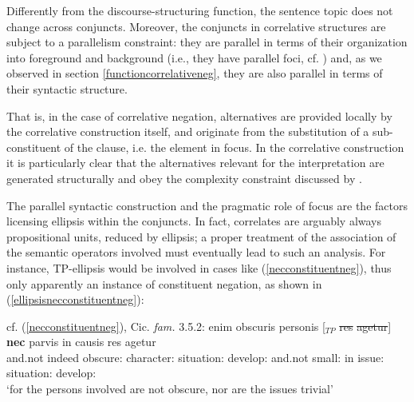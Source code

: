 \documentclass[output=paper,modfonts,nonflat,citecolor=brown,
showindex
]{langsci/langscibook}
\begin{document}
\vspace{0.5em}

\noindent Differently from the discourse-structuring function, the sentence topic does not change across conjuncts. Moreover, the conjuncts in correlative structures are subject to a parallelism constraint: they are parallel in terms of their organization into foreground and background (i.e., they have parallel foci, cf. \citealt[64]{Koenig91}) and, as we observed in section \ref{functioncorrelativeneg}, they are also parallel in terms of their syntactic structure.

That is, in the case of correlative negation, alternatives are provided locally by the correlative construction itself, and originate from the substitution of a sub-constituent of the clause, i.e. the element in focus. In the correlative construction it is particularly clear that the alternatives relevant for the interpretation are generated structurally and obey the complexity constraint discussed by \citet{Katzir07, FoxKatzir11}.

The parallel syntactic construction and the pragmatic role of focus are the factors licensing ellipsis within the conjuncts. In fact, correlates are arguably always propositional units, reduced by ellipsis; a proper treatment of the association of the semantic operators involved must eventually lead to such an analysis. For instance, TP-ellipsis would be involved in cases like (\ref{necconstituentneg}), thus only apparently an instance of constituent negation, as shown in (\ref{ellipsisnecconstituentneg}):

{\begin{exe}
\ex \label{ellipsisnecconstituentneg} cf. (\ref{necconstituentneg}), Cic. {\em{fam.}} 3.5.2:
 enim obscuris personis [$_{TP}$ \sout{res} \sout{agetur}] {\bf{nec}} parvis in causis res agetur\\
and.not indeed obscure:{} character:{} {} situation:{} develop:{} and.not small:{} in issue:{} situation:{} develop:{}\\

`for the persons involved are not obscure, nor are the issues trivial'
\end{exe}}
\end{document}
